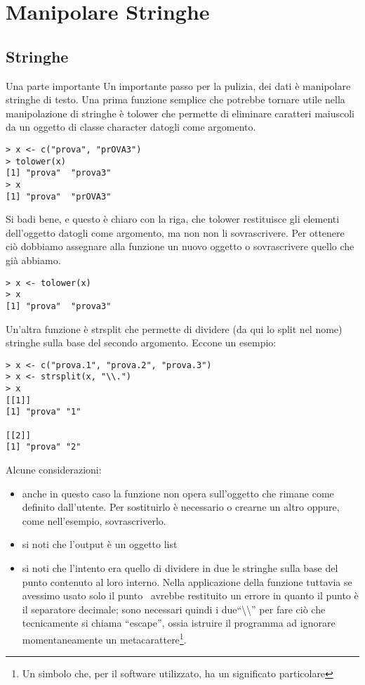 \chapter{Manipolare Stringhe}
\section{Stringhe}
Una parte importante 
Un importante passo per la pulizia,  dei dati è manipolare stringhe di testo.  
Una prima funzione semplice che potrebbe tornare utile nella manipolazione di stringhe è \textsf{tolower} che permette di eliminare caratteri maiuscoli da un   oggetto di classe character datogli come argomento. 
\begin{lstlisting}
> x <- c("prova", "prOVA3")
> tolower(x)
[1] "prova"  "prova3"
> x
[1] "prova"  "prOVA3"
\end{lstlisting}
Si badi bene, e questo è chiaro con la riga, che \textsf{tolower} restituisce gli elementi dell'oggetto datogli come argomento, ma non non li sovrascrivere. Per ottenere ciò dobbiamo assegnare alla funzione un nuovo oggetto o sovrascrivere quello che già abbiamo.
\begin{lstlisting}
> x <- tolower(x)
> x
[1] "prova"  "prova3"
\end{lstlisting}

Un'altra funzione è \textsf{strsplit} che permette di dividere (da qui lo split nel nome) stringhe sulla base del secondo argomento. Eccone un esempio:
\begin{lstlisting}
> x <- c("prova.1", "prova.2", "prova.3")
> x <- strsplit(x, "\\.")
> x
[[1]]
[1] "prova" "1"    

[[2]]
[1] "prova" "2"  
\end{lstlisting}
Alcune considerazioni:
\begin{itemize}
\item anche in questo caso la funzione non opera sull'oggetto che rimane come definito dall'utente. Per sostituirlo è necessario o crearne un altro oppure, come nell'esempio, sovrascriverlo.
\item si noti che l'output è un oggetto list
\item si noti che l'intento era quello di dividere in due le stringhe sulla base del punto contenuto al loro interno. Nella applicazione della funzione tuttavia se avessimo usato solo il punto \erre\ avrebbe restituito un errore in quanto il punto è il separatore decimale; sono necessari quindi i due``\textbackslash\textbackslash'' per fare ciò che tecnicamente si chiama ``escape'', ossia istruire il programma ad ignorare momentaneamente un metacarattere\footnote{Un simbolo che, per il software utilizzato, ha un significato particolare}.
\end{itemize}


